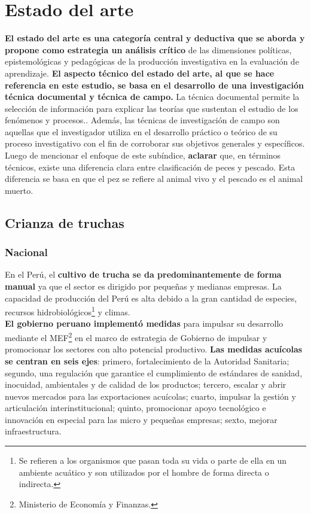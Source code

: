 \section{Estado del arte}
\textbf{El estado del arte es una categoría central y deductiva que se aborda y propone como estrategia un análisis crítico} de las dimensiones políticas, epistemológicas y pedagógicas de la producción investigativa en la evaluación de aprendizaje.\cite{GuevaraPatino2016} \textbf{El aspecto técnico del estado del arte, al que se hace referencia en este estudio, se basa en el desarrollo de una investigación técnica documental y técnica de campo.} La técnica documental permite la selección de información para explicar las teorías que sustentan el estudio de los fenómenos y procesos.. \cite{Martinez2003} Además, las técnicas de investigación de campo son aquellas que el investigador utiliza en el desarrollo práctico o teórico de su proceso investigativo con el fin de corroborar sus objetivos generales y específicos. \cite{GuevaraPatino2016}\\
Luego de mencionar el enfoque de este subíndice, \textbf{aclarar} que, en términos técnicos, existe una diferencia clara entre clasificación de peces y pescado. Esta diferencia se basa en que el pez se refiere al animal vivo y el pescado es el animal muerto.\\

\subsection{Crianza de truchas}

\subsubsection{Nacional}
En el Perú, el \textbf{cultivo de trucha se da predominantemente de forma manual} ya que el sector es dirigido por pequeñas y medianas empresas. La capacidad de producción del Perú es alta debido a la gran cantidad de especies, recursos hidrobiológicos\footnote{Se refieren a los organismos que pasan toda su vida o parte de ella en un ambiente acuático y son utilizados por el hombre de forma directa o indirecta.\cite{MINAGRI2011}} y climas.\\
\textbf{El gobierno peruano implementó medidas} para impulsar su desarrollo mediante el MEF\footnote{Ministerio de Economía y Finanzas.}  en el marco de estrategia de Gobierno de impulsar y promocionar los sectores con alto potencial productivo. \textbf{Las medidas acuícolas se centran en seis ejes}: primero, fortalecimiento de la Autoridad Sanitaria; segundo, una regulación que garantice el cumplimiento de estándares de sanidad, inocuidad, ambientales y de calidad de los productos; tercero, escalar y abrir nuevos mercados para las exportaciones acuícolas; cuarto, impulsar la gestión y articulación interinstitucional; quinto, promocionar apoyo tecnológico e innovación en especial para las micro y pequeñas empresas; sexto, mejorar infraestructura. \cite{Andina2019}\\

